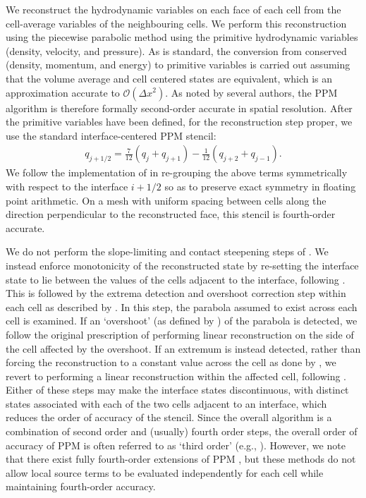 \documentclass[fleqn,usenatbib]{mnras}
\begin{document}
We reconstruct the hydrodynamic variables on each face of each cell from the cell-average variables of the neighbouring cells. We perform this reconstruction using the piecewise parabolic method \citep[PPM;][hereafter ]{Colella_1984} using the primitive hydrodynamic variables (density, velocity, and pressure). As is standard, the conversion from conserved (density, momentum, and energy) to primitive variables is carried out assuming that the volume average and cell centered states are equivalent, which is an approximation accurate to $\mathcal{O}(\Delta x^2)$. As noted by several authors, the PPM algorithm is therefore formally second-order accurate in spatial resolution. After the primitive variables have been defined, for the reconstruction step proper, we use the standard interface-centered PPM stencil:
\begin{align}
q_{j+1/2} = \frac{7}{12} (q_j + q_{j+1}) - \frac{1}{12} (q_{j+2} + q_{j-1}).
\end{align}
We follow the implementation of \cite{Stone_2020} in re-grouping the above terms symmetrically with respect to the interface ${i+{1/2}}$ so as to preserve exact symmetry in floating point arithmetic. On a mesh with uniform spacing between cells along the direction perpendicular to the reconstructed face, this stencil is fourth-order accurate.

We do not perform the slope-limiting and contact steepening steps of . We instead enforce monotonicity of the reconstructed state by re-setting the interface state to lie between the values of the cells adjacent to the interface, following \cite{Mignone_2005}. This is followed by the extrema detection and overshoot correction step within each cell as described by . In this step, the parabola assumed to exist across each cell is examined. If an `overshoot' (as defined by ) of the parabola is detected, we follow the original  prescription of performing linear reconstruction on the side of the cell affected by the overshoot. If an extremum is instead detected, rather than forcing the reconstruction to a constant value across the cell as done by , we revert to performing a linear reconstruction within the affected cell, following \cite{Balsara_2017}. Either of these steps may make the interface states discontinuous, with distinct states associated with each of the two cells adjacent to an interface, which reduces the order of accuracy of the stencil. Since the overall algorithm is a combination of second order and (usually) fourth order steps, the overall order of accuracy of PPM is often referred to as `third order' (e.g., \citealt{Stone_2020}). However, we note that there exist fully fourth-order extensions of PPM \citep{Felker_2018}, but these methods do not allow local source terms to be evaluated independently for each cell while maintaining fourth-order accuracy.
\end{document}
